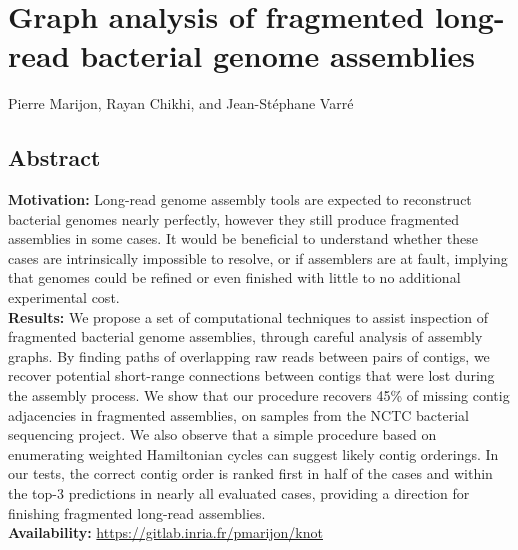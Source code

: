 \documentclass[./main.tex]{subfiles}
\newcommand{\modafterreview}[1]{#1}
\begin{document}

\section{Graph analysis of fragmented long-read bacterial genome assemblies} \label{section:postassembly:knot}

Pierre Marijon, Rayan Chikhi, and Jean-St\'ephane Varr\'e\

\subsection{Abstract}
\textbf{Motivation:} Long-read genome assembly tools are expected to reconstruct bacterial genomes nearly perfectly, however they still produce fragmented assemblies in some cases. %
It would be beneficial to understand whether these cases are intrinsically impossible to resolve, or if assemblers are at fault, implying that genomes could be refined or even finished with little to no additional experimental cost. \\
%
\textbf{Results:}  We propose a set of \modafterreview{computational} techniques to assist inspection of fragmented bacterial genome assemblies, through careful analysis of assembly graphs. %
By finding paths of overlapping raw reads between pairs of contigs, we recover potential short-range connections between contigs that were lost during the assembly process.  We show that our procedure recovers \modafterreview{45\% of missing contig adjacencies} in fragmented \canu assemblies, on samples from the NCTC bacterial sequencing project.
We also observe that a simple procedure based on enumerating weighted Hamiltonian cycles can suggest likely contig orderings. In our tests, the correct contig order is ranked first in half of the cases and within the top-3 predictions in \modafterreview{nearly all evaluated} cases, providing a direction for finishing fragmented long-read assemblies.\\

\textbf{Availability:} \url{https://gitlab.inria.fr/pmarijon/knot}\\
\end{document}
